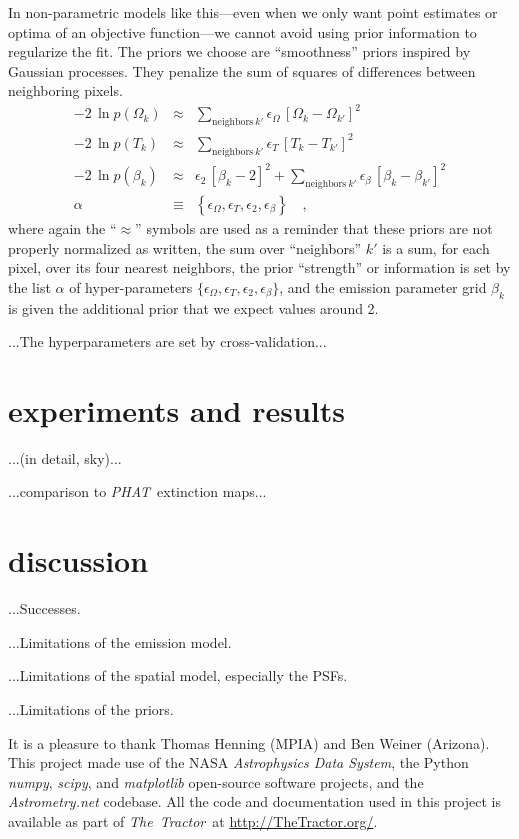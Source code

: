 \documentclass[12pt,pdftex,preprint]{aastex}
\newcommand{\project}[1]{\textsl{#1}}
\newcommand{\TheTractor}{\project{The~Tractor}}
\newcommand{\PHAT}{\project{PHAT}}
\begin{document}
In non-parametric models like this---even when we only want point
estimates or optima of an objective function---we cannot avoid using
prior information to regularize the fit.  The priors we choose are
``smoothness'' priors inspired by Gaussian processes.  They penalize
the sum of squares of differences between neighboring pixels.
\begin{eqnarray}\displaystyle
-2\,\ln p(\Omega_k) &\approx& \sum_{\mathrm{neighbors}~k'} \epsilon_\Omega\,\left[\Omega_k - \Omega_{k'}\right]^2
\\
-2\,\ln p(T_k) &\approx& \sum_{\mathrm{neighbors}~k'} \epsilon_T\,\left[T_k - T_{k'}\right]^2
\\
-2\,\ln p(\beta_k) &\approx& \epsilon_2\,\left[\beta_k - 2\right]^2
                    + \sum_{\mathrm{neighbors}~k'} \epsilon_\beta\,\left[\beta_k - \beta_{k'}\right]^2
\\
\alpha &\equiv& \left\{\epsilon_\Omega, \epsilon_T, \epsilon_2, \epsilon_\beta\right\}
\quad ,
\end{eqnarray}
where again the ``$\approx$'' symbols are used as a reminder that
these priors are not properly normalized as written, the sum over
``neighbors'' $k'$ is a sum, for each pixel, over its four nearest
neighbors, the prior ``strength'' or information is set by the list
$\alpha$ of hyper-parameters $\{\epsilon_\Omega, \epsilon_T,
\epsilon_2, \epsilon_\beta\}$, and the emission parameter grid
$\beta_k$ is given the additional prior that we expect values around
2.

...The hyperparameters are set by cross-validation...

\section{experiments and results}

...(in detail, sky)...

...comparison to \PHAT\ extinction maps...

\section{discussion}

...Successes.

...Limitations of the emission model.

...Limitations of the spatial model, especially the PSFs.

...Limitations of the priors.

\acknowledgements It is a pleasure to thank Thomas Henning (MPIA) and
Ben Weiner (Arizona).  This project made use of the NASA
\project{Astrophysics Data System}, the Python \project{numpy},
\project{scipy}, and \project{matplotlib} open-source software
projects, and the \project{Astrometry.net} codebase.  All the code and
documentation used in this project is available as part of
\TheTractor\ at \url{http://TheTractor.org/}.
\end{document}
